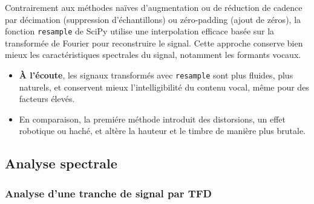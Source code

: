 Contrairement aux méthodes naïves d’augmentation ou de réduction de cadence par décimation (suppression d’échantillons) ou zéro-padding (ajout de zéros), la fonction \texttt{resample} de SciPy utilise une interpolation efficace basée sur la transformée de Fourier pour reconstruire le signal. Cette approche conserve bien mieux les caractéristiques spectrales du signal, notamment les formants vocaux.

\begin{itemize}
    \item \textbf{À l’écoute}, les signaux transformés avec \texttt{resample} sont plus fluides, plus naturels, et conservent mieux l’intelligibilité du contenu vocal, même pour des facteurs élevés.
    \item En comparaison, la premiére méthode introduit des distorsions, un effet robotique ou haché, et altère la hauteur et le timbre de manière plus brutale.
\end{itemize}

\newpage 
\subsection{Analyse spectrale}
\subsubsection{Analyse d’une tranche de signal par TFD}